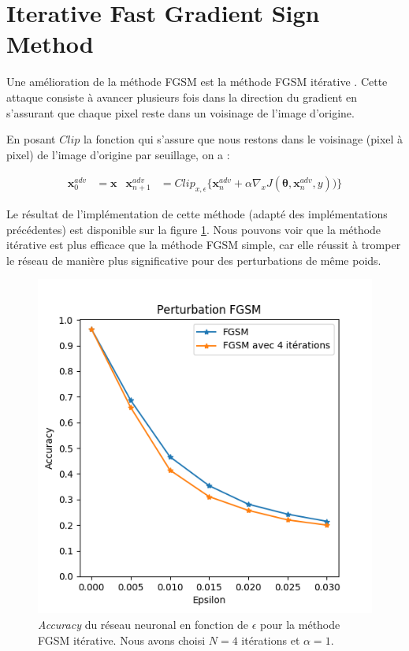 \documentclass[10pt,twocolumn,letterpaper]{article}
\begin{document}
\section{Iterative Fast Gradient Sign Method}
Une amélioration de la méthode FGSM est la méthode FGSM itérative \cite{kurakin2016}. Cette attaque consiste à avancer plusieurs fois dans la direction du gradient en s'assurant que chaque pixel reste dans un voisinage de l'image d'origine.

En posant $Clip$ la fonction qui s'assure que nous restons dans le voisinage (pixel à pixel) de l'image d'origine par seuillage, on a :

\begin{align}
\bm{x}^{adv}_0 &= \bm{x}  & \bm{x}^{adv}_{n+1} &= Clip_{x, \epsilon} \Big\{ \bm{x}^{adv}_n +\alpha \nabla_x J(\bm{\theta}, \bm{x}^{adv}_n, y)) \Big\}
\end{align}

Le résultat de l'implémentation de cette méthode (adapté des implémentations précédentes) est disponible sur la figure \ref{fig:fgsm_iter_plot}. Nous pouvons voir que la méthode itérative est plus efficace que la méthode FGSM simple, car elle réussit à tromper le réseau de manière plus significative pour des perturbations de même poids.

\begin{figure}[!h]
\begin{center}
\includegraphics[width=0.85\linewidth]{ressources/fgsm_iter_plot.png}
\end{center}
   \caption{\textit{Accuracy} du réseau neuronal en fonction de $\epsilon$ pour la méthode FGSM itérative. Nous avons choisi $N=4$ itérations et $\alpha =1$.}
\label{fig:fgsm_iter_plot}
\end{figure}
\end{document}
